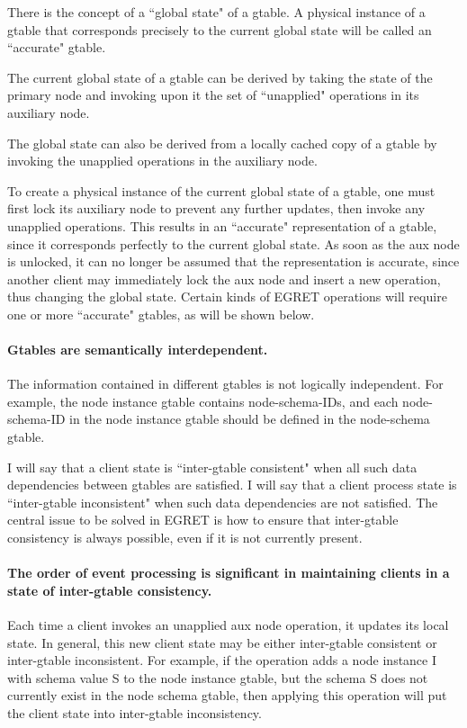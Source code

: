 There is the concept of a ``global state" of a gtable.  A physical
instance of a gtable that corresponds precisely to the current global
state will be called an ``accurate" gtable.

The current global state of a gtable can be derived by taking the
state of the primary node and invoking upon it the set of ``unapplied"
operations in its auxiliary node.

The global state can also be derived from a locally cached copy of a 
gtable by invoking the unapplied operations in the auxiliary node. 

To create a physical instance of the current global state of a gtable,
one must first lock its auxiliary node to prevent any further updates,
then invoke any unapplied operations.  This results in an ``accurate"
representation of a gtable, since it corresponds perfectly to the
current global state.  As soon as the aux node is unlocked, it can no
longer be assumed that the representation is accurate, since another
client may immediately lock the aux node and insert a new operation,
thus changing the global state. Certain kinds of EGRET operations will
require one or more ``accurate" gtables, as will be shown below.

\paragraph{Gtables are semantically interdependent.}

The information contained in different gtables is not logically
independent. For example, the node instance gtable contains
node-schema-IDs, and each node-schema-ID in the node instance gtable
should be defined in the node-schema gtable.

I will say that a client state is ``inter-gtable consistent" when all
such data dependencies between gtables are satisfied.  I will say that
a client process state is ``inter-gtable inconsistent" when such data
dependencies are not satisfied.  The central issue to be solved in
EGRET is how to ensure that inter-gtable consistency is always
possible, even if it is not currently present.

\paragraph {The order of event processing is significant in maintaining
clients in a state of inter-gtable consistency.}

Each time a client invokes an unapplied aux node operation, it updates
its local state.  In general, this new client state may be either
inter-gtable consistent or inter-gtable inconsistent.  For example, if
the operation adds a node instance I with schema value S to the node
instance gtable, but the schema S does not currently exist in the node
schema gtable, then applying this operation will put the client state
into inter-gtable inconsistency.

